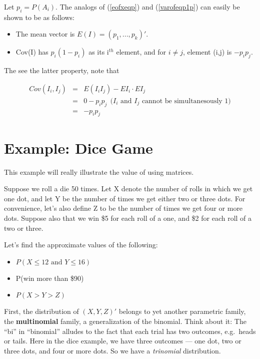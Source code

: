 Let $p_i = P(A_i)$.  The analogs of (\ref{eofxeqp}) and
(\ref{varofeqp1p}) can easily be shown to be as follows:

\begin{itemize}

\item The mean vector is $E(I) = (p_1,...,p_k)'$.

\item Cov(I) has $p_i(1-p_i)$ as its i$^{th}$ element, and for 
$i \neq j$, element (i,j) is $-p_i p_j$.

\end{itemize}

The see the latter property, note that

\begin{eqnarray}
Cov(I_i,I_j) &=& E(I_i I_j) - EI_i \cdot EI_j\\ 
&=& 0 - p_i p_j ~~ \textrm{($I_i$ and $I_j$ cannot be simultanesously 1)} \\
&=& -p_i p_j
\end{eqnarray}

\section{Example:  Dice Game}
\label{dicegame}

This example will really illustrate the value of using matrices.

Suppose we roll a die 50 times.  Let X denote the number of rolls in
which we get one dot, and let Y be the number of times we get either two
or three dots.  For convenience, let's also define Z to be the number of
times we get four or more dots.  Suppose also that we win \$5 for each
roll of a one, and \$2 for each roll of a two or three. 

Let's find the approximate values of the following:

\begin{itemize}

\item $P(X \leq 12 \textrm{ and } Y \leq 16)$

\item P(win more than \$90)

\item $P(X > Y > Z)$

\end{itemize}

First, the distribution of $(X,Y,Z)'$ belongs to yet another parametric
family, the {\bf multinomial} family, a generalization of the binomial.
Think about it:  The ``bi'' in ``binomial'' alludes to the fact that
each trial has two outcomes, e.g.\ heads or tails.  Here in the dice
example, we have three outcomes --- one dot, two or three dots, and four
or more dots.  So we have a {\it trinomial} distribution.  

